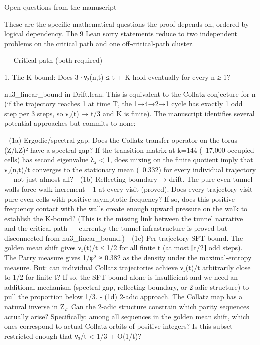 Open questions from the manuscript                                                 
                                                                                                                                                          
  These are the specific mathematical questions the proof depends on, ordered by logical dependency. The 9 Lean sorry statements reduce to two independent
   problems on the critical path and one off-critical-path cluster.

  ---
  Critical path (both required)

  1. The K-bound: Does 3·ν₃(n,t) ≤ t + K hold eventually for every n ≥ 1?

  nu3_linear_bound in Drift.lean. This is equivalent to the Collatz conjecture for n (if the trajectory reaches 1 at time T, the 1→4→2→1 cycle has exactly
   1 odd step per 3 steps, so ν₃(t) → t/3 and K is finite). The manuscript identifies several potential approaches but commits to none:

  - (1a) Ergodic/spectral gap. Does the Collatz transfer operator on the torus (Z/kZ)² have a spectral gap? If the transition matrix at k=144 (~17,000
  occupied cells) has second eigenvalue λ₂ < 1, does mixing on the finite quotient imply that ν₃(n,t)/t converges to the stationary mean (~0.332) for
  every individual trajectory — not just almost all?
  - (1b) Reflecting boundary → drift. The pure-even tunnel walls force walk increment +1 at every visit (proved). Does every trajectory visit pure-even
  cells with positive asymptotic frequency? If so, does this positive-frequency contact with the walls create enough upward pressure on the walk to
  establish the K-bound? (This is the missing link between the tunnel narrative and the critical path — currently the tunnel infrastructure is proved but
  disconnected from nu3_linear_bound.)
  - (1c) Per-trajectory SFT bound. The golden mean shift gives ν₃(t)/t ≤ 1/2 for all finite t (at most ⌈t/2⌉ odd steps). The Parry measure gives 1/φ² ≈
  0.382 as the density under the maximal-entropy measure. But: can individual Collatz trajectories achieve ν₃(t)/t arbitrarily close to 1/2 for finite t?
  If so, the SFT bound alone is insufficient and we need an additional mechanism (spectral gap, reflecting boundary, or 2-adic structure) to pull the
  proportion below 1/3.
  - (1d) 2-adic approach. The Collatz map has a natural inverse in Z₂. Can the 2-adic structure constrain which parity sequences actually arise?
  Specifically: among all sequences in the golden mean shift, which ones correspond to actual Collatz orbits of positive integers? Is this subset
  restricted enough that ν₃/t < 1/3 + O(1/t)?

